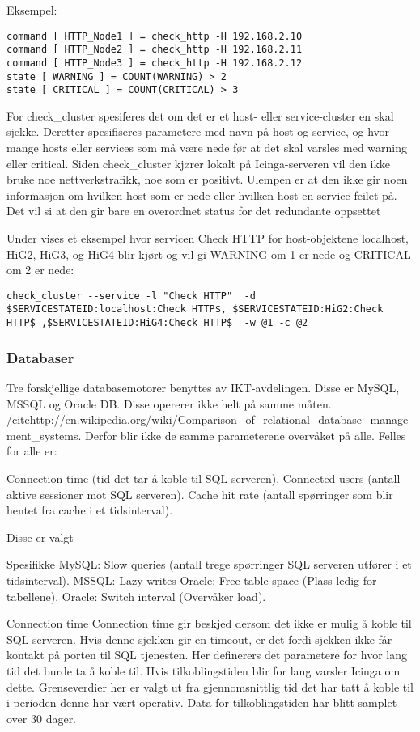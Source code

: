Eksempel:
\begin{lstlisting}
command [ HTTP_Node1 ] = check_http -H 192.168.2.10
command [ HTTP_Node2 ] = check_http -H 192.168.2.11
command [ HTTP_Node3 ] = check_http -H 192.168.2.12
state [ WARNING ] = COUNT(WARNING) > 2
state [ CRITICAL ] = COUNT(CRITICAL) > 3
\end{lstlisting}
For check\_cluster spesiferes det om det er et host- eller service-cluster en skal sjekke. Deretter spesifiseres parametere med navn på host og service, og hvor mange hosts eller services som må være nede før at det skal varsles med warning eller critical. Siden check\_cluster kjører lokalt på Icinga-serveren vil den ikke bruke noe nettverkstrafikk, noe som er positivt. Ulempen er at den ikke gir noen informasjon om hvilken host som er nede eller hvilken host en service feilet på. Det vil si at den gir bare en overordnet status for det redundante oppsettet     

Under vises et eksempel hvor servicen Check HTTP for host-objektene localhost, HiG2, HiG3, og HiG4 blir kjørt og vil gi WARNING om 1 er nede og CRITICAL om 2 er nede: 
\begin{lstlisting}
check_cluster --service -l "Check HTTP"  -d $SERVICESTATEID:localhost:Check HTTP$, $SERVICESTATEID:HiG2:Check HTTP$ ,$SERVICESTATEID:HiG4:Check HTTP$  -w @1 -c @2
\end{lstlisting}

\subsubsection{Databaser}
Tre forskjellige databasemotorer benyttes av IKT-avdelingen. Disse er MySQL, MSSQL og Oracle DB. Disse opererer ikke helt på samme måten. /cite{http://en.wikipedia.org/wiki/Comparison\_of\_relational\_database\_management\_systems}. Derfor blir ikke de samme parameterene overvåket på alle. Felles for alle er:

Connection time (tid det tar å koble til SQL serveren).
Connected users (antall aktive sessioner mot SQL serveren).
Cache hit rate (antall spørringer som blir hentet fra cache i et tidsinterval).

Disse er valgt

Spesifikke
MySQL: Slow queries (antall trege spørringer SQL serveren utfører i et tidsinterval).
MSSQL: Lazy writes
Oracle: Free table space (Plass ledig for tabellene).
Oracle: Switch interval (Overvåker load).


Connection time
Connection time gir beskjed dersom det ikke er mulig å koble til SQL serveren. Hvis denne sjekken gir en timeout, er det fordi sjekken ikke får kontakt på porten til SQL tjenesten. Her definerers det parametere for hvor lang tid det burde ta å koble til. Hvis tilkoblingstiden blir for lang varsler Icinga om dette. Grenseverdier her er valgt ut fra gjennomsnittlig tid det har tatt å koble til i perioden denne har vært operativ. Data for tilkoblingstiden har blitt samplet over 30 dager.


